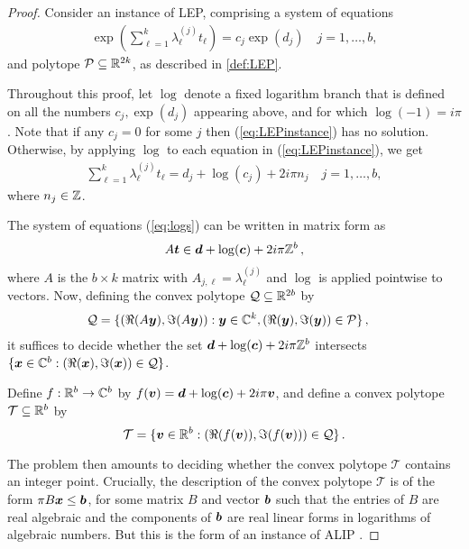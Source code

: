 \begin{proof}
Consider an instance of LEP, comprising a system of equations
\begin{align}
 \exp\left(\sum_{\ell=1}^{k} \lambda_\ell^{(j)} t_{\ell} \right) = c_j \exp (d_j)
\quad j=1,\ldots,b,
\label{eq:LEPinstance}
\end{align}
and polytope $\mathcal{P}\subseteq \mathbb{R}^{2k}$, as described in
\cref{def:LEP}.

Throughout this proof, let $\log$ denote a fixed logarithm branch that
is defined on all the numbers $c_j, \exp(d_j)$ appearing
above, and for which $\log(-1) = i \pi$. Note that if any $c_j=0$ for
some $j$ then (\ref{eq:LEPinstance}) has no solution. Otherwise, by
applying $\log$ to each equation in (\ref{eq:LEPinstance}),
we get
\begin{align}
\sum_{\ell=1}^{k} \lambda_\ell^{(j)} t_{\ell} = d_j+\log(c_j) + 2i\pi n_j \quad j=1,\ldots,b,
\label{eq:logs}
\end{align}
where $n_j \in \mathbb{Z}$.

The system of equations (\ref{eq:logs}) can be written in matrix form as
\begin{align*}
A \boldsymbol{t} \in \boldsymbol{d}+\log(\boldsymbol{c}) +
2i\pi \mathbb{Z}^b \, ,
\end{align*}
where $A$ is the $b\times k$ matrix with $A_{j,\ell} = \lambda_\ell^{(j)}$ and $\log$
is applied pointwise to vectors.
Now, defining the convex polytope $\mathcal{Q}\subseteq \mathbb{R}^{2b}$ by
\begin{align*}
\mathcal{Q} = \lbrace &(\Re(A\boldsymbol{y}), \Im(A\boldsymbol{y})) :
\boldsymbol{y}\in\mathbb{C}^{k}, (\Re(\boldsymbol{y}), \Im(\boldsymbol{y})) \in \mathcal{P} \rbrace \, ,
\end{align*}
it suffices to decide whether the set
$\boldsymbol{d} + \log(\boldsymbol{c})+ 2i\pi  \mathbb{Z}^b$
intersects
$\lbrace \boldsymbol{x} \in \mathbb{C}^b : (\Re(\boldsymbol{x}),
\Im(\boldsymbol{x})) \in \mathcal{Q} \rbrace$.

Define $f:\mathbb{R}^b \rightarrow \mathbb{C}^b$ by
$f(\boldsymbol{v})= \boldsymbol{d} + \log(\boldsymbol{c}) +
2i\pi \boldsymbol{v}$,
and define a convex polytope $\mathcal{T}\subseteq \mathbb{R}^b$ by
\[\mathcal{T}=\lbrace \boldsymbol{v}\in\mathbb{R}^b : (\Re(f(\boldsymbol{v})),
\Im (f(\boldsymbol{v}))) \in \mathcal{Q} \rbrace \, . \]

The problem then amounts to deciding whether the convex polytope
$\mathcal{T}$ contains an integer point. Crucially, the
description of the convex polytope $\mathcal{T}$ is of the form
$\pi B\boldsymbol{x} \leq \boldsymbol{b}$, for some matrix $B$ and
vector $\boldsymbol{b}$ such that the entries of $B$ are real
algebraic and the components of $\boldsymbol{b}$ are real linear forms
in logarithms of algebraic numbers.  But this is the form of an
instance of ALIP \@.
\end{proof}

